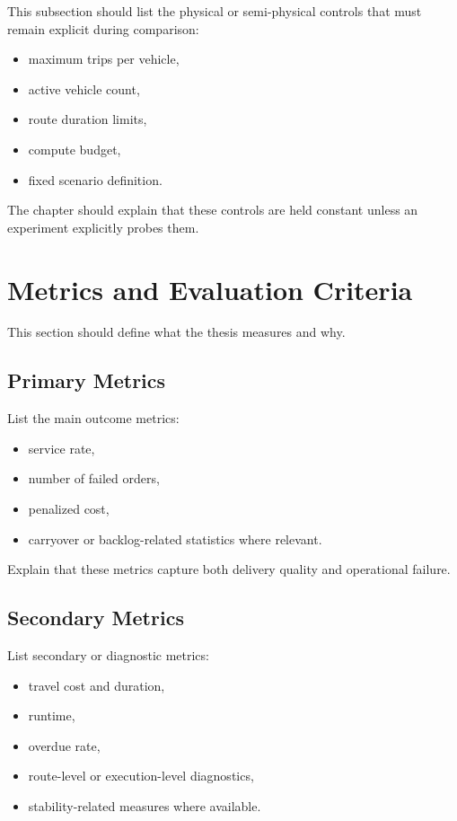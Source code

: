 This subsection should list the physical or semi-physical controls that must remain explicit during comparison:
\begin{itemize}
    \item maximum trips per vehicle,
    \item active vehicle count,
    \item route duration limits,
    \item compute budget,
    \item fixed scenario definition.
\end{itemize}

The chapter should explain that these controls are held constant unless an experiment explicitly probes them.

\section{Metrics and Evaluation Criteria}

This section should define what the thesis measures and why.

\subsection{Primary Metrics}

List the main outcome metrics:
\begin{itemize}
    \item service rate,
    \item number of failed orders,
    \item penalized cost,
    \item carryover or backlog-related statistics where relevant.
\end{itemize}

Explain that these metrics capture both delivery quality and operational failure.

\subsection{Secondary Metrics}

List secondary or diagnostic metrics:
\begin{itemize}
    \item travel cost and duration,
    \item runtime,
    \item overdue rate,
    \item route-level or execution-level diagnostics,
    \item stability-related measures where available.
\end{itemize}

